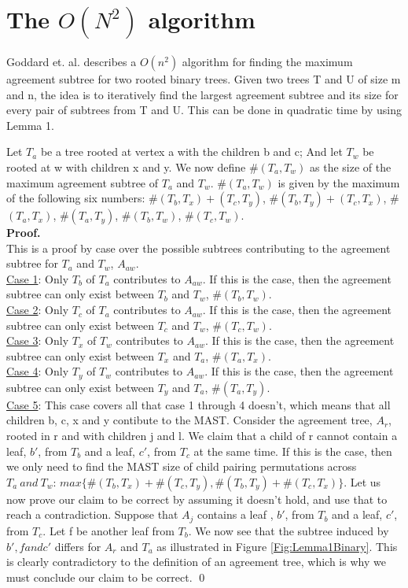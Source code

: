 \chapter{The $O(N^2)$ algorithm}
Goddard et. al.\cite{nsquared} describes a $O(n^2)$ algorithm for finding the maximum agreement subtree for two rooted binary trees. Given two trees T and U of size m and n, the idea is to iteratively find the largest agreement subtree and its size for every pair of subtrees from T and U. This can be done in quadratic time by using Lemma 1. 

\begin{Lemma}
	Let $T_a$ be a tree rooted at vertex a with the children b and c; And let $T_w$ be rooted at w with children x and y. We now define $\#(T_a,T_w)$ as the size of the maximum agreement subtree of $T_a$ and $T_w$.  $\#(T_a,T_w)$ is given by the maximum of the following six numbers: \#$(T_b,T_x)+(T_c,T_y)$,
	\#$(T_b,T_y)+(T_c,T_x)$,
	\#$(T_a,T_x)$,
	\#$(T_a,T_y)$,
	\#$(T_b,T_w)$,
	\#$(T_c,T_w)$.\\
	\textbf{Proof.}\\
	This is a proof by case over the possible subtrees contributing to the agreement subtree for $T_a$ and $T_w$, $A_{aw}$.\\
	\underline{Case 1}: Only $T_b$ of $T_a$ contributes to $A_{aw}$.
	If this is the case, then the agreement subtree can only exist between $T_b$ and $T_w$, \#$(T_b,T_w)$.\\
	\underline{Case 2}: Only $T_c$ of $T_a$ contributes to $A_{aw}$.
	If this is the case, then the agreement subtree can only exist between $T_c$ and $T_w$,
	\#$(T_c,T_w)$.\\
	\underline{Case 3}: Only $T_x$ of $T_w$ contributes to $A_{aw}$.
	If this is the case, then the agreement subtree can only exist between $T_x$ and $T_a$,
	\#$(T_a,T_x)$.\\
	\underline{Case 4}: Only $T_y$ of $T_w$ contributes to $A_{aw}$.
	If this is the case, then the agreement subtree can only exist between $T_y$ and $T_a$,
	\#$(T_a,T_y)$.\\
	\underline{Case 5}: This case covers all that case 1 through 4 doesn't, which means that all children b, c, x and y contibute to the MAST.
	Consider the agreement tree, $A_r$, rooted in r and with children j and l. We claim that a child of r cannot contain a leaf, $b'$, from $T_b$ and a leaf, $c'$, from $T_c$ at the same time. If this is the case, then we only need to find the MAST size of child pairing permutations across $T_a\ and\ T_w$: $max\{\#(T_b, T_x)+\#(T_c, T_y), \#(T_b, T_y)+\#(T_c, T_x)\}$.
	Let us now prove our claim to be correct by assuming it doesn't hold, and use that to reach a  contradiction. Suppose that $A_j$ contains a leaf , $b'$, from $T_b$ and a leaf, $c'$, from $T_c$. Let f be another leaf from $T_b$. We now see that the subtree induced by $b', f and c'$ differs for $A_r$ and $T_a$ as illustrated in Figure \ref{Fig:Lemma1Binary}. This is clearly contradictory to the definition of an agreement tree, which is why we must conclude our claim to be correct.
	\qed   	  
\end{Lemma}

